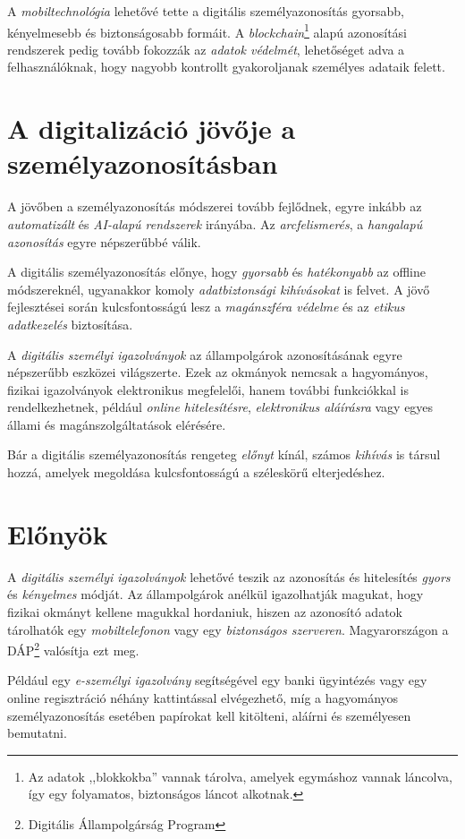 \documentclass[
]{thesis-ekf}
\theoremstyle{definition}
\theoremstyle{remark}
\begin{document}
	A \emph{mobiltechnológia} lehetővé tette a digitális személyazonosítás gyorsabb, kényelmesebb és biztonságosabb formáit. A \emph{blockchain}\footnote{Az adatok ,,blokkokba'' vannak tárolva, amelyek egymáshoz vannak láncolva, így egy folyamatos, biztonságos láncot alkotnak.} alapú azonosítási rendszerek pedig tovább fokozzák az \emph{adatok védelmét}, lehetőséget adva a felhasználóknak, hogy nagyobb kontrollt gyakoroljanak személyes adataik felett.
	
	\section{A digitalizáció jövője a személyazonosításban}
	A jövőben a személyazonosítás módszerei tovább fejlődnek, egyre inkább az \emph{automatizált} és \emph{AI-alapú rendszerek} irányába. Az \emph{arcfelismerés}, a \emph{hangalapú azonosítás} egyre népszerűbbé válik.
	
	A digitális személyazonosítás előnye, hogy \emph{gyorsabb} és \emph{hatékonyabb} az offline módszereknél, ugyanakkor komoly \emph{adatbiztonsági kihívásokat} is felvet. A jövő fejlesztései során kulcsfontosságú lesz a \emph{magánszféra védelme} és az \emph{etikus adatkezelés} biztosítása.
	
	A \emph{digitális személyi igazolványok} az állampolgárok azonosításának egyre népszerűbb eszközei világszerte. Ezek az okmányok nemcsak a hagyományos, fizikai igazolványok elektronikus megfelelői, hanem további funkciókkal is rendelkezhetnek, például \emph{online hitelesítésre}, \emph{elektronikus aláírásra} vagy egyes állami és magánszolgáltatások elérésére.
	
	Bár a digitális személyazonosítás rengeteg \emph{előnyt} kínál, számos \emph{kihívás} is társul hozzá, amelyek megoldása kulcsfontosságú a széleskörű elterjedéshez.

	\section{Előnyök}
	A \emph{digitális személyi igazolványok} lehetővé teszik az azonosítás és hitelesítés \emph{gyors} és \emph{kényelmes} módját. Az állampolgárok anélkül igazolhatják magukat, hogy fizikai okmányt kellene magukkal hordaniuk, hiszen az azonosító adatok tárolhatók egy \emph{mobiltelefonon} vagy egy \emph{biztonságos szerveren}. Magyarországon a DÁP\footnote{Digitális Állampolgárság Program} valósítja ezt meg.
	
	Például egy \emph{e-személyi igazolvány} segítségével egy banki ügyintézés vagy egy online regisztráció néhány kattintással elvégezhető, míg a hagyományos személyazonosítás esetében papírokat kell kitölteni, aláírni és személyesen bemutatni.
	
\end{document}

